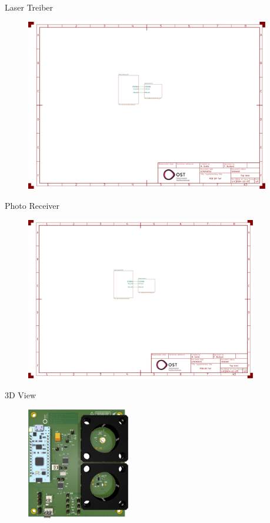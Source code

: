 \begin{frame}{Laser Treiber}
    \begin{figure}
        \includegraphics[page=3, trim=100 520 550 60, clip, width=0.95\textwidth]{../documentation/attachments/schematic.pdf}
    \end{figure}
\end{frame}

\begin{frame}{Photo Receiver}
    \begin{figure}
        \includegraphics[page=3, trim=100 240 600 340, clip, width=0.9\textwidth]{../documentation/attachments/schematic.pdf}
    \end{figure}
\end{frame}

\begin{frame}{3D View}
    \begin{figure}
        \includegraphics[width=0.4\textwidth]{../documentation/graphics/3d_top.png}
    \end{figure}
\end{frame}

